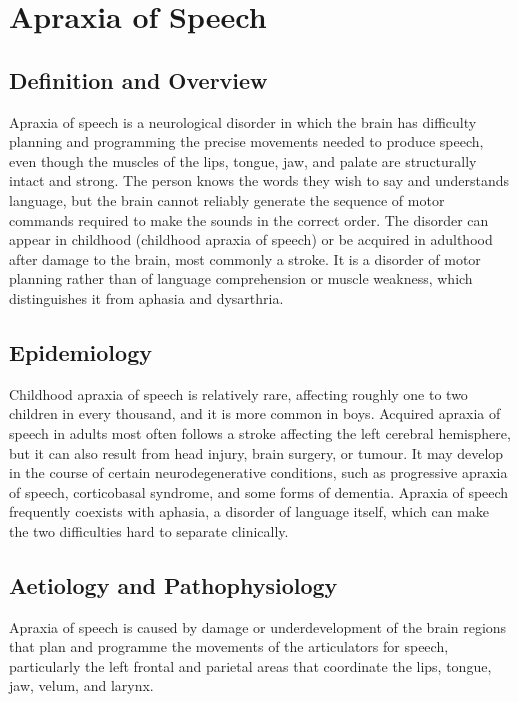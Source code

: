 \chapter{Apraxia of Speech}

\section*{Definition and Overview}
Apraxia of speech is a neurological disorder in which the brain has difficulty planning and programming the precise movements needed to produce speech, even though the muscles of the lips, tongue, jaw, and palate are structurally intact and strong. The person knows the words they wish to say and understands language, but the brain cannot reliably generate the sequence of motor commands required to make the sounds in the correct order. The disorder can appear in childhood (childhood apraxia of speech) or be acquired in adulthood after damage to the brain, most commonly a stroke. It is a disorder of motor planning rather than of language comprehension or muscle weakness, which distinguishes it from aphasia and dysarthria.

\section*{Epidemiology}
Childhood apraxia of speech is relatively rare, affecting roughly one to two children in every thousand, and it is more common in boys. Acquired apraxia of speech in adults most often follows a stroke affecting the left cerebral hemisphere, but it can also result from head injury, brain surgery, or tumour. It may develop in the course of certain neurodegenerative conditions, such as progressive apraxia of speech, corticobasal syndrome, and some forms of dementia. Apraxia of speech frequently coexists with aphasia, a disorder of language itself, which can make the two difficulties hard to separate clinically.

\section*{Aetiology and Pathophysiology}
Apraxia of speech is caused by damage or underdevelopment of the brain regions that plan and programme the movements of the articulators for speech, particularly the left frontal and parietal areas that coordinate the lips, tongue, jaw, velum, and larynx.

